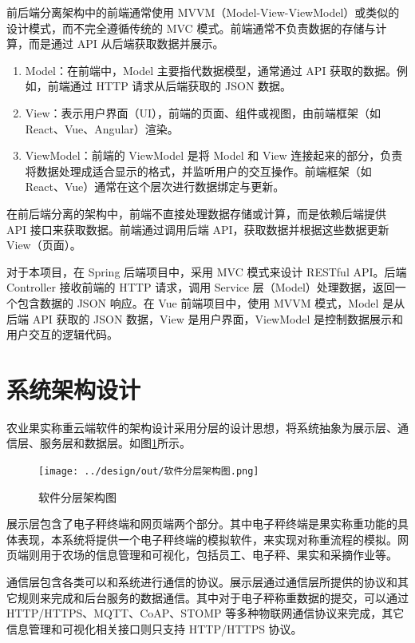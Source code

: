 前后端分离架构中的前端通常使用 MVVM（Model-View-ViewModel）或类似的设计模式，而不完全遵循传统的 MVC 模式。前端通常不负责数据的存储与计算，而是通过 API 从后端获取数据并展示。
\begin{enumerate}
    \item Model：在前端中，Model 主要指代数据模型，通常通过 API 获取的数据。例如，前端通过 HTTP 请求从后端获取的 JSON 数据。
    \item View：表示用户界面（UI），前端的页面、组件或视图，由前端框架（如 React、Vue、Angular）渲染。
    \item ViewModel：前端的 ViewModel 是将 Model 和 View 连接起来的部分，负责将数据处理成适合显示的格式，并监听用户的交互操作。前端框架（如 React、Vue）通常在这个层次进行数据绑定与更新。
\end{enumerate}

在前后端分离的架构中，前端不直接处理数据存储或计算，而是依赖后端提供 API 接口来获取数据。前端通过调用后端 API，获取数据并根据这些数据更新 View（页面）。

对于本项目，在 Spring 后端项目中，采用 MVC 模式来设计 RESTful API。后端 Controller 接收前端的 HTTP 请求，调用 Service 层（Model）处理数据，返回一个包含数据的 JSON 响应。在 Vue 前端项目中，使用 MVVM 模式，Model 是从后端 API 获取的 JSON 数据，View 是用户界面，ViewModel 是控制数据展示和用户交互的逻辑代码。

\section{系统架构设计}

农业果实称重云端软件的架构设计采用分层的设计思想，将系统抽象为展示层、通信层、服务层和数据层。如图\ref{fig:软件分层架构图}所示。

\begin{figure}[H]
    \centering
    \texttt{[image: ../design/out/软件分层架构图.png]}
    \caption{软件分层架构图}
    \label{fig:软件分层架构图}
\end{figure}

展示层包含了电子秤终端和网页端两个部分。其中电子秤终端是果实称重功能的具体表现，本系统将提供一个电子秤终端的模拟软件，来实现对称重流程的模拟。网页端则用于农场的信息管理和可视化，包括员工、电子秤、果实和采摘作业等。

通信层包含各类可以和系统进行通信的协议。展示层通过通信层所提供的协议和其它规则来完成和后台服务的数据通信。其中对于电子秤称重数据的提交，可以通过 HTTP/HTTPS、MQTT、CoAP、STOMP 等多种物联网通信协议来完成，其它信息管理和可视化相关接口则只支持 HTTP/HTTPS 协议。

